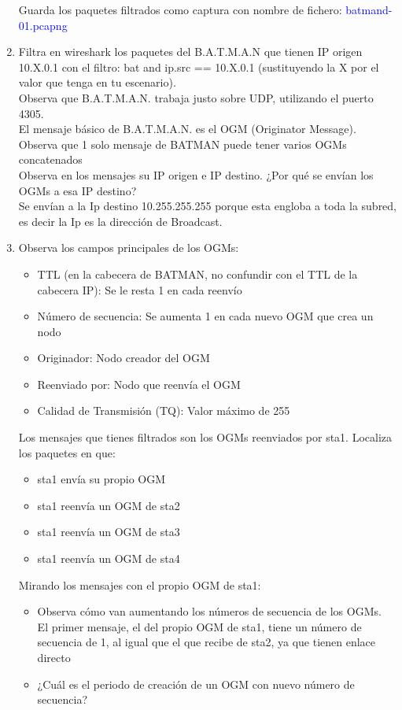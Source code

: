 \documentclass[12pt, a4paper]{report}
\begin{document}
\begin{enumerate}
	Guarda los paquetes filtrados como captura con nombre de fichero: \textcolor{blue}{batmand-01.pcapng}
	\item Filtra en wireshark los paquetes del B.A.T.M.A.N que tienen IP origen 10.X.0.1 con el filtro:
	bat and ip.src == 10.X.0.1 (sustituyendo la X por el valor que tenga en tu escenario).\\
	Observa que B.A.T.M.A.N. trabaja justo sobre UDP, utilizando el puerto 4305.\\
	El mensaje básico de B.A.T.M.A.N. es el OGM (Originator Message). Observa que 1 solo mensaje
	de BATMAN puede tener varios OGMs concatenados\\
	Observa en los mensajes su IP origen e IP destino. ¿Por qué se envían los OGMs a esa IP destino?\\
	
	Se envían a la Ip destino 10.255.255.255 porque esta engloba a toda la subred, es decir la Ip es la dirección de Broadcast.
	\item Observa los campos principales de los OGMs:
	\begin{itemize}
		\item TTL (en la cabecera de BATMAN, no confundir con el TTL de la cabecera IP): Se le resta
		1 en cada reenvío
		\item Número de secuencia: Se aumenta 1 en cada nuevo OGM que crea un nodo
		\item Originador: Nodo creador del OGM
		\item Reenviado por: Nodo que reenvía el OGM
		\item Calidad de Transmisión (TQ): Valor máximo de 255
	\end{itemize}
	Los mensajes que tienes filtrados son los OGMs reenviados por sta1. Localiza los paquetes en
	que:
	\begin{itemize}
		\item sta1 envía su propio OGM
		\item sta1 reenvía un OGM de sta2
		\item sta1 reenvía un OGM de sta3
		\item sta1 reenvía un OGM de sta4
	\end{itemize}
	Mirando los mensajes con el propio OGM de sta1:
	\begin{itemize}
		\item Observa cómo van aumentando los números de secuencia de los OGMs.\\
		
		El primer mensaje, el del propio OGM de sta1, tiene un número de secuencia de 1, al igual que el que recibe de sta2, ya que tienen enlace directo
		\item ¿Cuál es el periodo de creación de un OGM con nuevo número de secuencia?\\
		

\end{itemize}
\end{enumerate}
\end{document}
